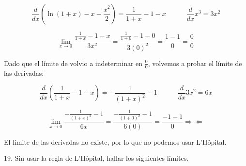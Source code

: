 \documentclass[12pt]{article}
\begin{document}
\begin{enumerate}[\hspace{9px} a)]
        \begin{equation*}
            \frac{d}{dx}\left(\ln(1+x)-x-\frac{x^2}{2}\right) = \frac{1}{1+x}-1-x \qquad \quad \frac{d}{dx}x^3=3x^2
        \end{equation*}

        \begin{equation*}
            \lim_{x \to 0}\frac{\frac{1}{1+x}-1-x}{3x^2} = \frac{\frac{1}{1+0}-1-0}{3(0)^2} = \frac{1-1}{0} = \frac{0}{0}
        \end{equation*}

        Dado que el l\'imite de volvio a indeterminar en \(\displaystyle\frac{0}{0}\), volvemos a probar el l\'imite de las derivadas:

        \begin{equation*}
            \frac{d}{dx}\left(\frac{1}{1+x}-1-x\right)= -\frac{1}{(1+x)^2}-1 \qquad \quad \frac{d}{dx}3x^2=6x
        \end{equation*}

        \begin{equation*}
            \lim_{x \to 0}\frac{-\frac{1}{(1+x)^2}-1}{6x} = \frac{-\frac{1}{(1+0)^2}-1}{6(0)} = \frac{-1-1}{0} \Rightarrow\!\Leftarrow
        \end{equation*}

        El l\'imite de las derivadas no existe, por lo que no podemos usar L'H\^opital.

\end{enumerate}

19. Sin usar la regla de L'H\^opital, hallar los siguientes l\'imites.
\end{document}
